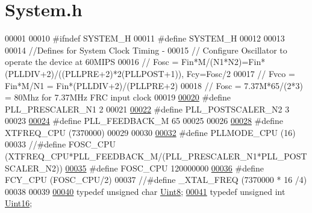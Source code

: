 \hypertarget{a00072_source}{\section{System.\+h}
\label{a00072_source}
}

\begin{DoxyCode}
00001 
00010 \textcolor{preprocessor}{#ifndef SYSTEM\_H}
00011 \textcolor{preprocessor}{#define SYSTEM\_H}
00012 
00013 
00014 \textcolor{comment}{//Defines for System Clock Timing -}
00015 \textcolor{comment}{// Configure Oscillator to operate the device at 60MIPS}
00016 \textcolor{comment}{// Fosc  = Fin*M/(N1*N2)=Fin*(PLLDIV+2)/((PLLPRE+2)*2(PLLPOST+1)), Fcy=Fosc/2}
00017 \textcolor{comment}{// Fvco  = Fin*M/N1 = Fin*(PLLDIV+2)/(PLLPRE+2)}
00018 \textcolor{comment}{// Fosc  = 7.37M*65/(2*3) = 80Mhz for 7.37MHz FRC input clock}
00019 
\hypertarget{a00072_source_l00020}{}\hyperlink{a00072_a512a7743d94a6335ddd824498dc56df7}{00020} \textcolor{preprocessor}{#define PLL\_PRESCALER\_N1      2}
00021 
\hypertarget{a00072_source_l00022}{}\hyperlink{a00072_a39c4650028eea85070da15dc0a967d8a}{00022} \textcolor{preprocessor}{#define PLL\_POSTSCALER\_N2     3}
00023 
\hypertarget{a00072_source_l00024}{}\hyperlink{a00072_a616f73024087cf3c328cde290113065a}{00024} \textcolor{preprocessor}{#define PLL\_FEEDBACK\_M        65}
00025 
00026 
\hypertarget{a00072_source_l00028}{}\hyperlink{a00072_a719092b960b832b468fd401ed27b9003}{00028} \textcolor{preprocessor}{#define XTFREQ\_CPU           (7370000)}
00029 
00030 
\hypertarget{a00072_source_l00032}{}\hyperlink{a00072_a0d6b8c656533d3c815daa9d575998950}{00032} \textcolor{preprocessor}{#define PLLMODE\_CPU          (16)}
00033 \textcolor{comment}{//#define FOSC\_CPU             (XTFREQ\_CPU*PLL\_FEEDBACK\_M/(PLL\_PRESCALER\_N1*PLL\_POSTSCALER\_N2))}
\hypertarget{a00072_source_l00035}{}\hyperlink{a00072_a64b7f2fd4683ad3dcd74ccab1eba40d7}{00035} \textcolor{preprocessor}{#define FOSC\_CPU             120000000}
\hypertarget{a00072_source_l00036}{}\hyperlink{a00072_a573f918b7668f8f2b59ac8adeae633a4}{00036} \textcolor{preprocessor}{#define FCY\_CPU              (FOSC\_CPU/2)}
00037 \textcolor{comment}{//#define \_XTAL\_FREQ           (7370000 * 16 /4)}
00038 
00039 
\hypertarget{a00072_source_l00040}{}\hyperlink{a00072_af84840501dec18061d18a68c162a8fa2}{00040} \textcolor{keyword}{typedef} \textcolor{keywordtype}{unsigned} \textcolor{keywordtype}{char}        \hyperlink{a00072_af84840501dec18061d18a68c162a8fa2}{Uint8};
\hypertarget{a00072_source_l00041}{}\hyperlink{a00072_a59a9f6be4562c327cbfb4f7e8e18f08b}{00041} \textcolor{keyword}{typedef} \textcolor{keywordtype}{unsigned} \textcolor{keywordtype}{int}         \hyperlink{a00072_a59a9f6be4562c327cbfb4f7e8e18f08b}{Uint16};

\end{DoxyCode}
